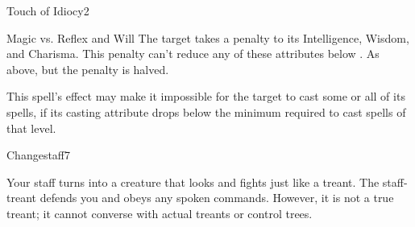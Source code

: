 \begin{spellfooter}
\begin{spellsection}{Touch of Idiocy}{2}
    \begin{spellheader}
    \end{spellheader}
    \begin{spellcontent}
        \begin{spelltargetinginfo}
        \end{spelltargetinginfo}
        \begin{spelleffects}
            \begin{spellattack}{Magic vs. Reflex and Will}
                \spellsuccess[Reflex] The target takes a  penalty to its Intelligence, Wisdom, and Charisma. This penalty can't reduce any of these attributes below .
                \spellfailure[Will] As above, but the penalty is halved.
            \end{spellattack}
            \spelldur \durshort
        \end{spelleffects}
    \end{spellcontent}
    \begin{spellfooter}
        \spellnotes This spell's effect may make it impossible for the target to cast some or all of its spells, if its casting attribute drops below the minimum required to cast spells of that level.
    \end{spellfooter}
\end{spellsection}

\begin{spellsection}{Changestaff}{7}
    \begin{spellheader}
    \end{spellheader}
    \begin{spellcontent}
        \begin{spelltargetinginfo}
        \end{spelltargetinginfo}
        \begin{spelleffects}
            \spelleffect Your staff turns into a creature that looks and fights just like a treant. The staff-treant defends you and obeys any spoken commands. However, it is not a true treant; it cannot converse with actual treants or control trees.


\end{spelleffects}
\end{spellcontent}
\end{spellsection}
\end{spellfooter}
